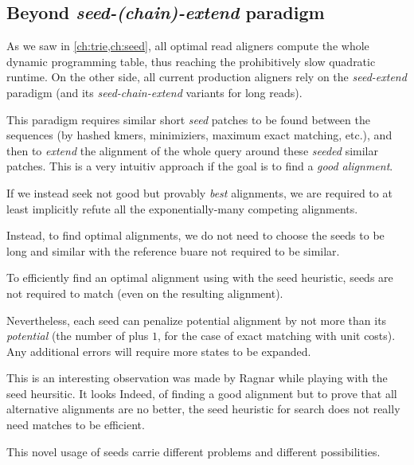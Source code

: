 \subsection*{Beyond \emph{seed-(chain)-extend} paradigm}

As we saw in \cref{ch:trie,ch:seed}, all optimal read aligners compute the whole
dynamic programming table, thus reaching the prohibitively slow quadratic
runtime. On the other side, all current production aligners rely on the
\emph{seed-extend} paradigm (and its \emph{seed-chain-extend} variants for long
reads).

This paradigm requires similar short \emph{seed} patches to be found
between the sequences (\AG by hashed kmers, minimiziers, maximum exact matching,
etc.), and then to \emph{extend} the alignment of the whole query around these
\emph{seeded} similar patches. This is a very intuitiv approach if the goal is
to find a \emph{good alignment}.

If we instead seek not good but provably \emph{best} alignments, we are required
to at least implicitly refute all the exponentially-many competing alignments.

Instead, to find optimal alignments, we do not need to choose the seeds to be
long and similar with the reference buare not required to be similar.

\begin{observation}
    To efficiently find an optimal alignment using \A with the seed heuristic,
    seeds are not required to match (even on the resulting alignment).
\end{observation}

Nevertheless, each seed can penalize potential alignment by not more than its
\emph{potential} (\ie the number of plus $1$, for the case of exact matching
with unit costs). Any additional errors will require more states to be expanded.

This is an interesting observation was made by Ragnar while playing with the
seed heursitic. It looks Indeed, of finding a good alignment but to prove that all
alternative alignments are no better, the seed heuristic for \A search does not
really need matches to be efficient.

This novel usage of seeds carrie different problems and different possibilities.